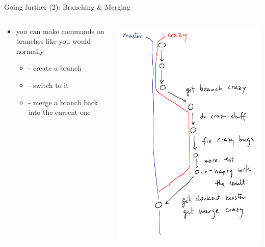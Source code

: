\begin{frame}{Going further (2): Branching \& Merging}
  \begin{columns}[onlytextwidth]
    \begin{column}{0.5\textwidth}
      \begin{itemize}
        \item you can make commands on branches like you would normally
        \begin{itemize}
          \item {} - create a branch
          \item {} - switch to it
          \item {} - merge a branch back into the current one
        \end{itemize}
      \end{itemize}
    \end{column}
    \begin{column}{0.5\textwidth}
      \includegraphics[height=\textheight]{imgs/branches}
    \end{column}
  \end{columns}
\end{frame}

